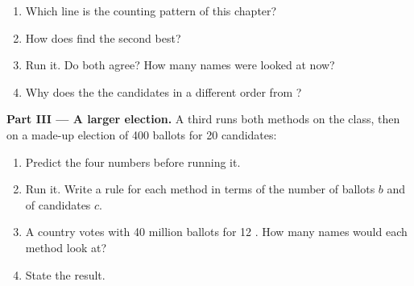 \begin{problem}
\begin{enumerate}[resume]
  \item Which line is the counting pattern of this chapter?
  \item How does  find the second best?
  \item Run it. Do both  agree? How many names were looked at now?
  \item Why does the   the candidates in a different order from
    ?
\end{enumerate}

\medskip\noindent\textbf{Part III --- A larger election.} A third  runs
both methods on the class, then on a made-up election of 400 ballots for 20
candidates:

\label{lst:g8:dictionaries:compare}

\begin{enumerate}[resume]
  \item Predict the four numbers before running it.
  \item Run it. Write a rule for each method in terms of the number of
    ballots $b$ and of candidates $c$.
  \item A country votes with 40 million ballots for 12 . How many names
    would each method look at?
  \item State the result.
\end{enumerate}
\end{problem}

